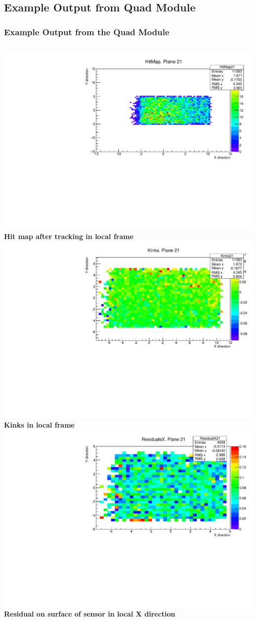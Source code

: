 \documentclass{beamer}
\begin{document}
\subsection{Example Output from Quad Module}
\begin{frame}
\frametitle{Example Output from the Quad Module}
\begin{columns}[t]
\centering
\includegraphics[width=0.8\linewidth]{pics/HitMapQuadAfterTrack.pdf}\\
\tiny{\textbf{Hit map after tracking in local frame}}\\
\includegraphics[width=0.8\linewidth]{pics/kinksQuad.pdf}\\
\tiny{\textbf{Kinks in local frame}}\\
\centering
\includegraphics[width=0.8\linewidth]{pics/QuadXRes73Micron.pdf}\\ 
\tiny{\textbf{Residual on surface of sensor in local X direction}}


\end{columns}
\end{frame}
\end{document}

